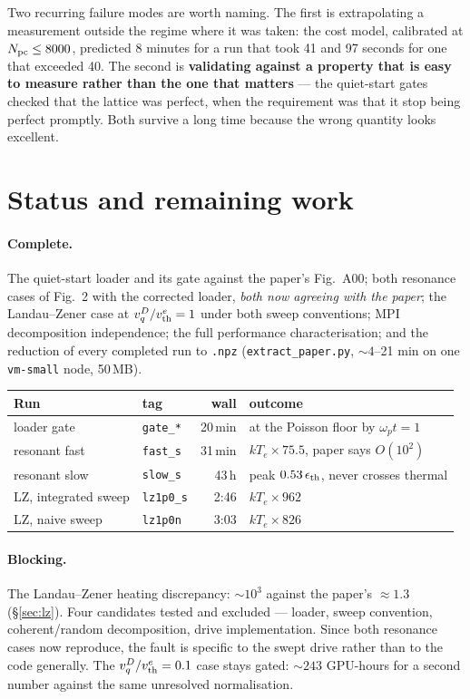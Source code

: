 \documentclass[11pt,a4paper]{article}
\newcommand{\code}[1]{\texttt{\small #1}}
\newcommand{\wpt}{\omega_p t}
\newcommand{\vth}{v_{\rm th}^{e}}
\newcommand{\Npc}{N_{\rm pc}}
\begin{document}
\noindent Two recurring failure modes are worth naming. The first is extrapolating a
measurement outside the regime where it was taken: the cost model, calibrated at
$\Npc \le 8000$, predicted 8 minutes for a run that took 41 and 97 seconds for one
that exceeded 40. The second is \textbf{validating against a property that is easy to
measure rather than the one that matters} --- the quiet-start gates checked that the
lattice was perfect, when the requirement was that it stop being perfect promptly.
Both survive a long time because the wrong quantity looks excellent.

\section{Status and remaining work}
\label{sec:status}

\paragraph{Complete.} The quiet-start loader and its gate against the paper's
Fig.~A00; both resonance cases of Fig.~2 with the corrected loader, \emph{both now
agreeing with the paper}; the Landau--Zener case at $v_q^D/\vth = 1$ under both sweep
conventions; MPI decomposition independence; the full performance
characterisation; and the reduction of every completed run to \code{.npz}
(\code{extract\_paper.py}, ${\sim}4$--21 min on one \code{vm-small} node, 50\,MB).

\begin{center}\small
\begin{tabular}{@{}llrl@{}}
\toprule
Run & tag & wall & outcome \\
\midrule
loader gate            & \code{gate\_*}   & 20\,min  & at the Poisson floor by $\wpt=1$ \\
resonant fast          & \code{fast\_s}   & 31\,min  & $kT_e \times 75.5$, paper says $O(10^2)$ \\
resonant slow          & \code{slow\_s}   & 43\,h    & peak $0.53\,\epsilon_{\rm th}$, never crosses thermal \\
LZ, integrated sweep   & \code{lz1p0\_s}  & 2:46     & $kT_e \times 962$ \\
LZ, naive sweep        & \code{lz1p0n}    & 3:03     & $kT_e \times 826$ \\
\bottomrule
\end{tabular}
\end{center}

\paragraph{Blocking.} The Landau--Zener heating discrepancy: ${\sim}10^3$ against the
paper's ${\approx}1.3$ (\S\ref{sec:lz}). Four candidates tested and excluded ---
loader, sweep convention, coherent/random decomposition, drive implementation. Since
both resonance cases now reproduce, the fault is specific to the swept drive rather
than to the code generally. The $v_q^D/\vth = 0.1$ case stays gated: ${\sim}243$
GPU-hours for a second number against the same unresolved normalisation.
\end{document}
